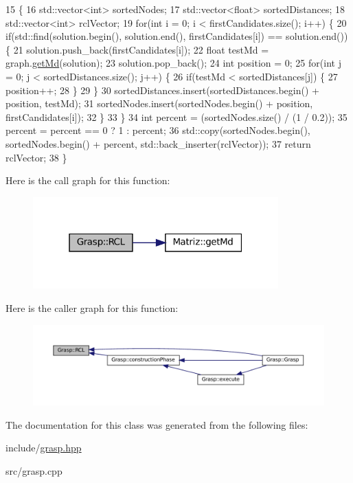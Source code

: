 \begin{DoxyCode}
15                                                                                   \{
16    std::vector<int> sortedNodes;
17    std::vector<float> sortedDistances;
18    std::vector<int> rclVector;
19    \textcolor{keywordflow}{for}(\textcolor{keywordtype}{int} i = 0; i < firstCandidates.size(); i++) \{
20      \textcolor{keywordflow}{if}(std::find(solution.begin(), solution.end(), firstCandidates[i]) == solution.end()) \{
21        solution.push\_back(firstCandidates[i]);
22        \textcolor{keywordtype}{float} testMd = graph.\hyperlink{classMatriz_a8df14a27d791f24206dd633b2a685c5b}{getMd}(solution);
23        solution.pop\_back();
24        \textcolor{keywordtype}{int} position = 0;
25        \textcolor{keywordflow}{for}(\textcolor{keywordtype}{int} j = 0; j < sortedDistances.size(); j++) \{
26          \textcolor{keywordflow}{if}(testMd < sortedDistances[j]) \{
27            position++;
28          \}
29        \}
30        sortedDistances.insert(sortedDistances.begin() + position, testMd);
31        sortedNodes.insert(sortedNodes.begin() + position, firstCandidates[i]);
32      \}
33    \}
34    \textcolor{keywordtype}{int} percent = (sortedNodes.size() / (1 / 0.2));
35    percent = percent == 0 ? 1 : percent;
36    std::copy(sortedNodes.begin(), sortedNodes.begin() + percent, std::back\_inserter(rclVector));
37    \textcolor{keywordflow}{return} rclVector;
38  \}
\end{DoxyCode}
Here is the call graph for this function\+:
\nopagebreak
\begin{figure}[H]
\begin{center}
\leavevmode
\includegraphics[width=268pt]{classGrasp_ac63d4a1892472663549c77686edfed74_cgraph}
\end{center}
\end{figure}
Here is the caller graph for this function\+:
\nopagebreak
\begin{figure}[H]
\begin{center}
\leavevmode
\includegraphics[width=350pt]{classGrasp_ac63d4a1892472663549c77686edfed74_icgraph}
\end{center}
\end{figure}


The documentation for this class was generated from the following files\+:\begin{DoxyCompactItemize}
\item 
include/\hyperlink{grasp_8hpp}{grasp.\+hpp}\item 
src/grasp.\+cpp\end{DoxyCompactItemize}
